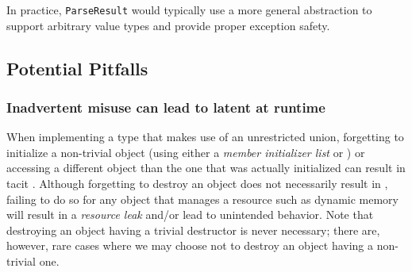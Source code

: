 In practice, \lstinline!ParseResult! would typically use a more general  abstraction to support arbitrary value types and provide proper exception safety.


\subsection[Potential Pitfalls]{Potential Pitfalls}\label{potential-pitfalls}

\subsubsection[Inadvertent misuse can lead to latent \romeogloss{undefined behavior} at runtime]{Inadvertent misuse can lead to latent  at runtime}\label{inadvertent-misuse-can-lead-to-latent-undefined-behavior-at-runtime}

When implementing a type that makes use of an unrestricted union,
forgetting to initialize a non-trivial object (using either a
\emph{member initializer list} or ) or
accessing a different object than the one that was actually initialized
can result in tacit . Although forgetting to
destroy an object does not necessarily result in , failing to do so for any object that manages a resource such
as dynamic memory will result in a \emph{resource leak} and/or lead to
unintended behavior. Note that destroying an
object having a trivial destructor is never necessary; there are, however, rare cases where
we may choose not to destroy an object having a non-trivial
one.

